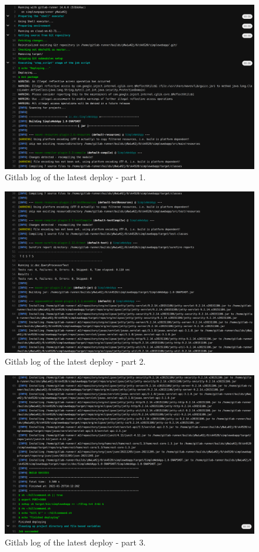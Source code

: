 \documentclass[a4paper]{article}
\begin{document}
\begin{figure}[H]
  \includegraphics[width=\textwidth]{deploy1.png}
  \caption{Gitlab log of the latest deploy - part 1.}
\end{figure}

\begin{figure}[H]
  \includegraphics[width=\textwidth]{deploy2.png}
  \caption{Gitlab log of the latest deploy - part 2.}
\end{figure}

\begin{figure}[H]
  \includegraphics[width=\textwidth]{deploy3.png}
  \caption{Gitlab log of the latest deploy - part 3.}
\end{figure}
\end{document}
